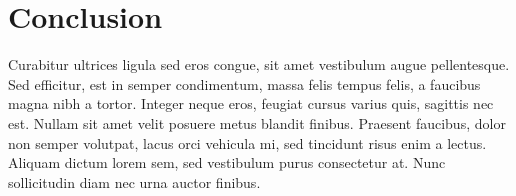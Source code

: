 \documentclass[12pt, letterpaper]{article}
\begin{document}
\section*{Conclusion}
Curabitur ultrices ligula sed eros congue, sit amet vestibulum augue pellentesque. Sed efficitur, est in semper condimentum, massa felis tempus felis, a faucibus magna nibh a tortor. Integer neque eros, feugiat cursus varius quis, sagittis nec est. Nullam sit amet velit posuere metus blandit finibus. Praesent faucibus, dolor non semper volutpat, lacus orci vehicula mi, sed tincidunt risus enim a lectus. Aliquam dictum lorem sem, sed vestibulum purus consectetur at. Nunc sollicitudin diam nec urna auctor finibus.
\end{document}
